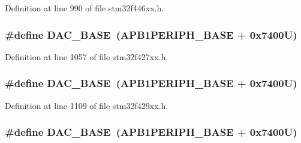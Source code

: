 Definition at line 990 of file stm32f446xx.\+h.

\subsubsection[{\texorpdfstring{D\+A\+C\+\_\+\+B\+A\+SE}{DAC_BASE}}]{\setlength{\rightskip}{0pt plus 5cm}\#define D\+A\+C\+\_\+\+B\+A\+SE~({\bf A\+P\+B1\+P\+E\+R\+I\+P\+H\+\_\+\+B\+A\+SE} + 0x7400\+U)}\hypertarget{group___peripheral__memory__map_gad18d0b914c7f68cecbee1a2d23a67d38}{}\label{group___peripheral__memory__map_gad18d0b914c7f68cecbee1a2d23a67d38}


Definition at line 1057 of file stm32f427xx.\+h.

\subsubsection[{\texorpdfstring{D\+A\+C\+\_\+\+B\+A\+SE}{DAC_BASE}}]{\setlength{\rightskip}{0pt plus 5cm}\#define D\+A\+C\+\_\+\+B\+A\+SE~({\bf A\+P\+B1\+P\+E\+R\+I\+P\+H\+\_\+\+B\+A\+SE} + 0x7400\+U)}\hypertarget{group___peripheral__memory__map_gad18d0b914c7f68cecbee1a2d23a67d38}{}\label{group___peripheral__memory__map_gad18d0b914c7f68cecbee1a2d23a67d38}


Definition at line 1109 of file stm32f429xx.\+h.

\subsubsection[{\texorpdfstring{D\+A\+C\+\_\+\+B\+A\+SE}{DAC_BASE}}]{\setlength{\rightskip}{0pt plus 5cm}\#define D\+A\+C\+\_\+\+B\+A\+SE~({\bf A\+P\+B1\+P\+E\+R\+I\+P\+H\+\_\+\+B\+A\+SE} + 0x7400\+U)}\hypertarget{group___peripheral__memory__map_gad18d0b914c7f68cecbee1a2d23a67d38}{}\label{group___peripheral__memory__map_gad18d0b914c7f68cecbee1a2d23a67d38}


